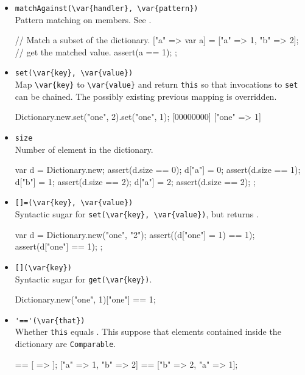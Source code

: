 \begin{itemize}
\item \lstinline|matchAgainst(\var{handler}, \var{pattern})|\\
  Pattern matching on members.  See .

\begin{urbiscript}
{
  // Match a subset of the dictionary.
  ["a" => var a] = ["a" => 1, "b" => 2];
  // get the matched value.
  assert(a == 1);
};
\end{urbiscript}

\item \lstinline|set(\var{key}, \var{value})|\\
  Map \lstinline|\var{key}| to \lstinline|\var{value}| and return
  \lstinline|this| so that invocations to \lstinline|set| can be
  chained.  The possibly existing previous mapping is overridden.

\begin{urbiscript}
Dictionary.new.set("one", 2).set("one", 1);
[00000000] ["one" => 1]
\end{urbiscript}

\item \lstinline|size|\\
  Number of element in the dictionary.

\begin{urbiscript}
{
  var d = Dictionary.new;
  assert(d.size == 0);
  d["a"] = 0;
  assert(d.size == 1);
  d["b"] = 1;
  assert(d.size == 2);
  d["a"] = 2;
  assert(d.size == 2);
};
\end{urbiscript}

\item \lstinline|[]=(\var{key}, \var{value})|\\
  Syntactic sugar for \lstinline|set(\var{key}, \var{value})|, but
  returns .

\begin{urbiscript}
{
  var d = Dictionary.new("one", "2");
  assert((d["one"] = 1) == 1);
  assert(d["one"] == 1);
};
\end{urbiscript}

\item \lstinline|[](\var{key})|\\
  Syntactic sugar for \lstinline|get(\var{key})|.

\begin{urbiassert}
Dictionary.new("one", 1)["one"] == 1;
\end{urbiassert}

\item \lstinline|'=='(\var{that})|\\
  Whether \lstinline|this| equals .  This suppose that elements
  contained inside the dictionary are \lstinline|Comparable|.
\begin{urbiassert}
[ => ] == [ => ];
["a" => 1, "b" => 2] == ["b" => 2, "a" => 1];
\end{urbiassert}

\end{itemize}


